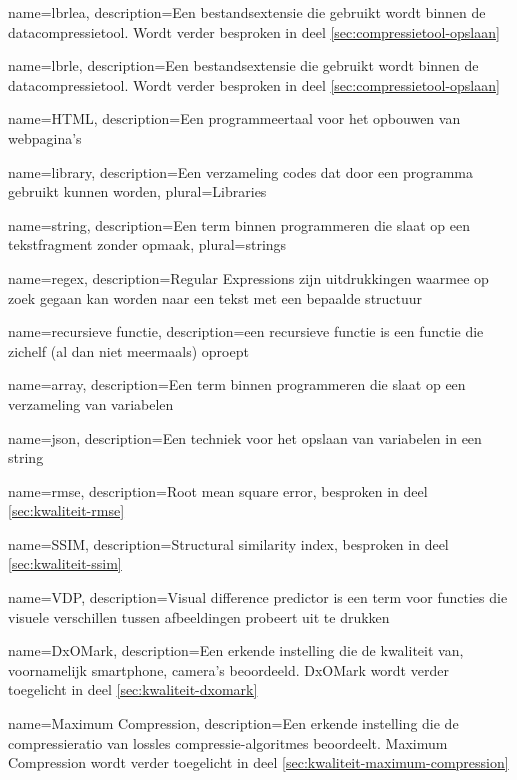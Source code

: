 {
	name={lbrlea},
	description={Een bestandsextensie die gebruikt wordt binnen de datacompressietool. Wordt verder besproken in deel \ref{sec:compressietool-opslaan}}
}

{
	name={lbrle},
	description={Een bestandsextensie die gebruikt wordt binnen de datacompressietool. Wordt verder besproken in deel \ref{sec:compressietool-opslaan}}
}

{
	name={HTML},
	description={Een programmeertaal voor het opbouwen van webpagina's}
}

{
	name={library},
	description={Een verzameling codes dat door een programma gebruikt kunnen worden},
	plural={Libraries}
}

{
	name={string},
	description={Een term binnen programmeren die slaat op een tekstfragment zonder opmaak},
	plural={strings}
}

{
	name={regex},
	description={Regular Expressions zijn uitdrukkingen waarmee op zoek gegaan kan worden naar een tekst met een bepaalde structuur}
}

{
	name={recursieve functie},
	description={een recursieve functie is een functie die zichelf (al dan niet meermaals) oproept}
}

{
	name={array},
	description={Een term binnen programmeren die slaat op een verzameling van variabelen}
}

{
	name={json},
	description={Een techniek voor het opslaan van variabelen in een string}
}

{
	name={rmse},
	description={Root mean square error, besproken in deel \ref{sec:kwaliteit-rmse}}
}

{
	name={SSIM},
	description={Structural similarity index, besproken in deel \ref{sec:kwaliteit-ssim}}
}

{
	name={VDP},
	description={Visual difference predictor is een term voor functies die visuele verschillen tussen afbeeldingen probeert uit te drukken}
}

{
	name={DxOMark},
	description={Een erkende instelling die de kwaliteit van, voornamelijk smartphone, camera's beoordeeld. DxOMark wordt verder toegelicht in deel \ref{sec:kwaliteit-dxomark}}
}

{
	name={Maximum Compression},
	description={Een erkende instelling die de compressieratio van lossles compressie-algoritmes beoordeelt. Maximum Compression wordt verder toegelicht in deel \ref{sec:kwaliteit-maximum-compression}}
}

